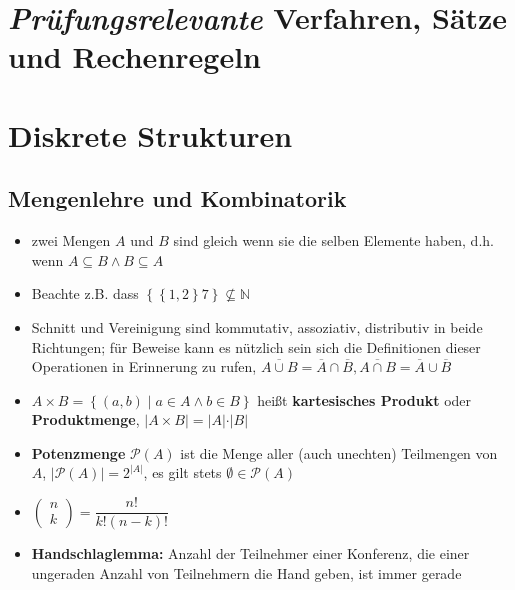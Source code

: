 \documentclass[10pt,a4paper]{article}
\begin{document}
\section*{\textit{Prüfungsrelevante} Verfahren, Sätze und Rechenregeln}
\section{Diskrete Strukturen}
\subsection{Mengenlehre und Kombinatorik}
\begin{itemize}
\item zwei Mengen $A$ und $B$ sind gleich wenn sie die selben Elemente haben, d.h. wenn $A \subseteq B \land B \subseteq A$
\item Beachte z.B. dass $\left\lbrace\left\lbrace 1,2\right\rbrace 7\right\rbrace \nsubseteq \mathbb{N}$
\item Schnitt und Vereinigung sind kommutativ, assoziativ, distributiv in beide Richtungen; für Beweise kann es nützlich sein sich die Definitionen dieser Operationen in Erinnerung zu rufen, $\overline{A\cup B}=\overline{A}\cap \overline{B}, \overline{A\cap B}=\overline{A}\cup \overline{B}$
\item $A\times B=\left\lbrace (a,b)\mid a\in A \land b\in B\right\rbrace$ heißt \textbf{kartesisches Produkt} oder \textbf{Produktmenge},  $\vert A\times B\vert =\vert A\vert \cdot \vert B\vert$
\item \textbf{Potenzmenge} $\mathcal{P}(A)$ ist die Menge aller (auch unechten) Teilmengen von $A$, $\vert \mathcal{P}(A)\vert =2^{\vert A\vert}$, es gilt stets $\emptyset \in \mathcal{P}(A)$
\item $\begin{pmatrix} n\\ k\end{pmatrix}=\dfrac{n!}{k!(n-k)!}$
\item \textbf{Handschlaglemma:} Anzahl der Teilnehmer einer Konferenz, die einer ungeraden Anzahl von Teilnehmern die Hand geben, ist immer gerade


\end{itemize}
\end{document}
